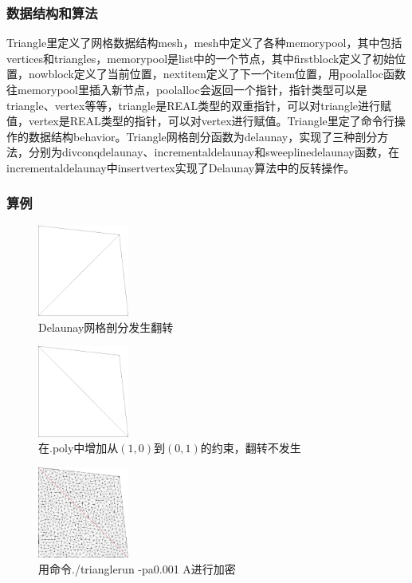 \subsubsection{数据结构和算法}

Triangle里定义了网格数据结构mesh，mesh中定义了各种memorypool，其中包括vertices和triangles，memorypool是list中的一个节点，其中firstblock定义了初始位置，nowblock定义了当前位置，nextitem定义了下一个item位置，用poolalloc函数往memorypool里插入新节点，poolalloc会返回一个指针，指针类型可以是triangle、vertex等等，triangle是REAL类型的双重指针，可以对triangle进行赋值，vertex是REAL类型的指针，可以对vertex进行赋值。Triangle里定了命令行操作的数据结构behavior。Triangle网格剖分函数为delaunay，实现了三种剖分方法，分别为divconqdelaunay、incrementaldelaunay和sweeplinedelaunay函数，在incrementaldelaunay中insertvertex实现了Delaunay算法中的反转操作。

\subsubsection{算例}

\begin{figure}[!htbp]
  \centering
  \includegraphics[height=3cm]{fig/1/8.png}
  \caption{Delaunay网格剖分发生翻转}
  \label{fig:1-7}
\end{figure}

\begin{figure}[!htbp]
  \centering
  \includegraphics[height=3cm]{fig/1/9.png}
  \caption{在.poly中增加从$(1,0)$到$(0,1)$的约束，翻转不发生}
  \label{fig:1-7}
\end{figure}

\begin{figure}[!htbp]
  \centering
  \includegraphics[height=3cm]{fig/1/10.png}
  \caption{用命令./trianglerun -pa0.001 A进行加密}
  \label{fig:1-7}
\end{figure}

